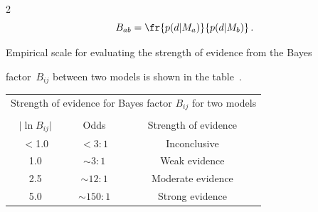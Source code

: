 \begin{multicols}{2}
  $$


  B_{ab} = \fr{p(d\vert M_a)}{p(d\vert M_b)}\,.


  $$


  Empirical scale for evaluating the strength of evidence from the Bayes


factor~$B_{ij}$ between two models is shown in the table~\cite{32-kl}.





\vspace*{3pt}







{\small


  \begin{center}








\begin{tabular}{ccc}


\multicolumn{3}{c}{Strength of evidence for Bayes factor $B_{ij}$ for two models}\\


&&\\[-6pt]


\hline


  $\vert \ln B_{ij}\vert$&Odds&Strength of evidence\\


  \hline


  $<$1.0\hphantom{$<$}&$< 3 : 1$&Inconclusive\\


  1.0&$\sim 3 : 1$&Weak evidence\\


  2.5&$\sim 12 : 1$\hphantom{9}&Moderate evidence\\


  5.0&$\sim150 : 1$\hphantom{99}&Strong evidence\\


  \hline


  \end{tabular}


  \end{center}}







  \vspace*{12pt}









\end{multicols}
